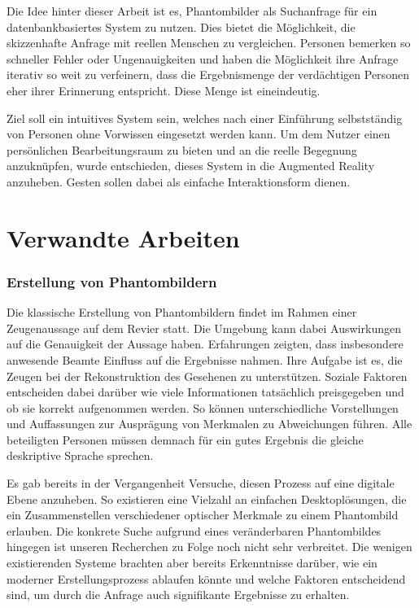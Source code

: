 \documentclass{sigchi-ext}
\begin{document}
Die Idee hinter dieser Arbeit ist es, Phantombilder als Suchanfrage
für ein datenbankbasiertes System zu nutzen. Dies bietet die
Möglichkeit, die skizzenhafte Anfrage mit reellen Menschen zu
vergleichen. Personen bemerken so schneller Fehler oder
Ungenauigkeiten und haben die Möglichkeit ihre Anfrage iterativ so
weit zu verfeinern, dass die Ergebnismenge der verdächtigen Personen
eher ihrer Erinnerung entspricht. Diese Menge ist eineindeutig. %

Ziel soll ein intuitives System sein, welches nach einer Einführung selbstständig von Personen ohne Vorwissen eingesetzt werden kann. Um dem Nutzer einen persönlichen Bearbeitungsraum zu bieten und an die reelle Begegnung anzuknüpfen, wurde entschieden, dieses System in die Augmented Reality anzuheben. Gesten sollen dabei als einfache Interaktionsform dienen.

\section{Verwandte Arbeiten}
\subsubsection{Erstellung von Phantombildern}
Die klassische Erstellung von Phantombildern findet im Rahmen einer Zeugenaussage auf dem Revier statt. Die Umgebung kann dabei Auswirkungen auf die Genauigkeit der Aussage haben. Erfahrungen zeigten, dass insbesondere anwesende Beamte Einfluss auf die Ergebnisse nahmen. Ihre Aufgabe ist es, die Zeugen bei der Rekonstruktion des Gesehenen zu unterstützen. Soziale Faktoren entscheiden dabei darüber wie viele Informationen tatsächlich preisgegeben und ob sie korrekt aufgenommen werden. So können unterschiedliche Vorstellungen und Auffassungen zur Ausprägung von Merkmalen zu Abweichungen führen. Alle beteiligten Personen müssen demnach für ein gutes Ergebnis die gleiche deskriptive Sprache sprechen. ~\cite{buchholz:stimme}

Es gab bereits in der Vergangenheit Versuche, diesen Prozess auf eine
digitale Ebene anzuheben. So existieren eine Vielzahl an einfachen
Desktoplösungen, die ein Zusammenstellen verschiedener optischer
Merkmale zu einem Phantombild erlauben. %
Die konkrete Suche aufgrund eines veränderbaren Phantombildes hingegen ist unseren Recherchen zu Folge noch nicht sehr verbreitet. Die wenigen existierenden Systeme brachten aber bereits Erkenntnisse darüber, wie ein moderner Erstellungsprozess ablaufen könnte und welche Faktoren entscheidend sind, um durch die Anfrage auch signifikante Ergebnisse zu erhalten.
\end{document}
